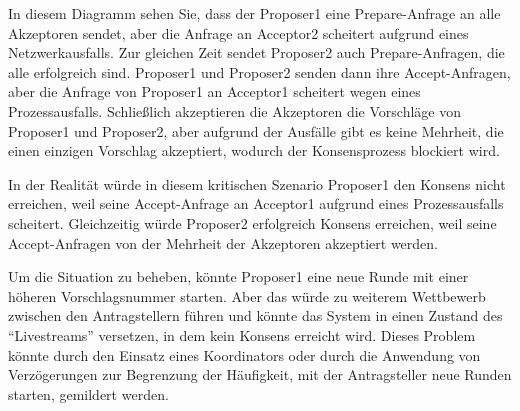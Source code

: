 In diesem Diagramm sehen Sie, dass der Proposer1 eine Prepare-Anfrage an alle Akzeptoren sendet, aber die Anfrage an Acceptor2 scheitert aufgrund eines Netzwerkausfalls. Zur gleichen Zeit sendet Proposer2 auch Prepare-Anfragen, die alle erfolgreich sind. Proposer1 und Proposer2 senden dann ihre Accept-Anfragen, aber die Anfrage von Proposer1 an Acceptor1 scheitert wegen eines Prozessausfalls. Schließlich akzeptieren die Akzeptoren die Vorschläge von Proposer1 und Proposer2, aber aufgrund der Ausfälle gibt es keine Mehrheit, die einen einzigen Vorschlag akzeptiert, wodurch der Konsensprozess blockiert wird.

In der Realität würde in diesem kritischen Szenario Proposer1 den Konsens nicht erreichen, weil seine Accept-Anfrage an Acceptor1 aufgrund eines Prozessausfalls scheitert. Gleichzeitig würde Proposer2 erfolgreich Konsens erreichen, weil seine Accept-Anfragen von der Mehrheit der Akzeptoren akzeptiert werden.

Um die Situation zu beheben, könnte Proposer1 eine neue Runde mit einer höheren Vorschlagsnummer starten. Aber das würde zu weiterem Wettbewerb zwischen den Antragstellern führen und könnte das System in einen Zustand des \enquote{Livestreams} versetzen, in dem kein Konsens erreicht wird. Dieses Problem könnte durch den Einsatz eines Koordinators oder durch die Anwendung von Verzögerungen zur Begrenzung der Häufigkeit, mit der Antragsteller neue Runden starten, gemildert werden.

